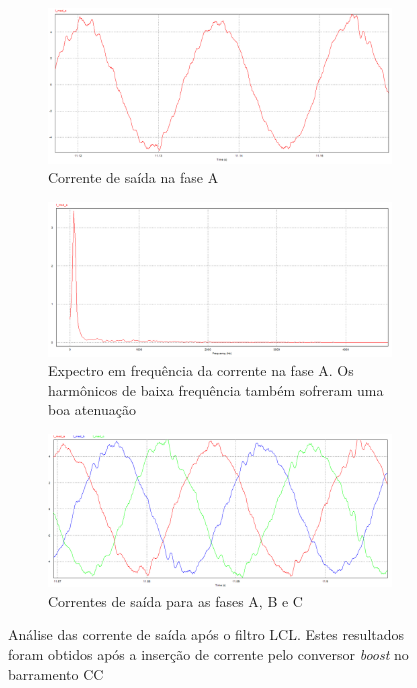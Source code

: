 \begin{figure}[!hbt]
	\centering
	\begin{subfigure}[b]{\textwidth}
		\centering
		\includegraphics[width=\textwidth]{figuras/sim_figures/sistema_completo/corrente_saida_inversor_1.PNG}
		\caption{Corrente de saída na fase A}
    \end{subfigure}

    \begin{subfigure}[b]{\textwidth}
		\centering
		\includegraphics[width=\textwidth]{figuras/sim_figures/sistema_completo/corrente_saida_inversor_fft.PNG}
		\caption{Expectro em frequência da corrente na fase A. Os harmônicos de baixa frequência também sofreram uma boa atenuação}
    \end{subfigure}

	\begin{subfigure}[b]{\textwidth}
		\includegraphics[width=\textwidth]{figuras/sim_figures/sistema_completo/corrente_saida_inversor_2.PNG}
		\caption{Correntes de saída para as fases A, B e C}
	\end{subfigure}
    \caption{Análise das corrente de saída após o filtro LCL. Estes resultados foram obtidos após a inserção de corrente pelo conversor \textit{boost} no barramento CC}
    \label{fig:sim-corrente-saida-inversor}
\end{figure}

